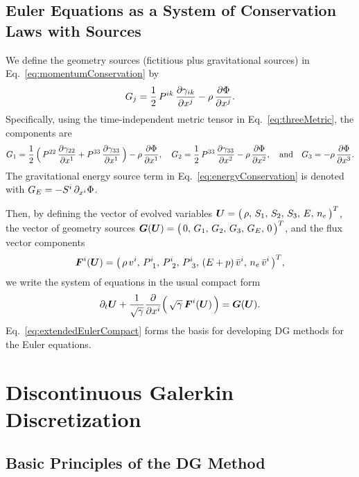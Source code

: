 \documentclass[10pt,preprint]{aastex}
\begin{document}
\subsection{Euler Equations as a System of Conservation Laws with Sources}

We define the geometry sources (fictitious plus gravitational sources) in Eq.~\eqref{eq:momentumConservation} by
\begin{equation}
  G_{j}
  =\frac{1}{2}\,P^{ik}\,\frac{\partial \gamma_{ik}}{\partial x^{j}}-\rho\,\frac{\partial \Phi}{\partial x^{j}}.  
\end{equation}
Specifically, using the time-independent metric tensor in Eq.~\eqref{eq:threeMetric}, the components are
\begin{equation}
  G_{1}
  =\frac{1}{2}\,\Big(\,P^{22}\,\frac{\partial \gamma_{22}}{\partial x^{1}}+P^{33}\,\frac{\partial \gamma_{33}}{\partial x^{1}}\,\Big)-\rho\,\frac{\partial \Phi}{\partial x^{1}}, \quad
  G_{2}
  =\frac{1}{2}\,P^{33}\,\frac{\partial \gamma_{33}}{\partial x^{2}}-\rho\,\frac{\partial \Phi}{\partial x^{2}}, \quad\text{and}\quad
  G_{3}
  =-\rho\,\frac{\partial \Phi}{\partial x^{3}}.
\end{equation}
The gravitational energy source term in Eq.~\eqref{eq:energyConservation} is denoted with $G_{E}=-S^{i}\,\partial_{x^{i}}{\Phi}$.  

Then, by defining the vector of evolved variables $\boldsymbol{U}=\big(\,\rho,\,S_{1},\,S_{2},\,S_{3},\,E,\,n_{e}\,\big)^{T}$, the vector of geometry sources $\boldsymbol{G}(\boldsymbol{U})=\big(\,0,\,G_{1},\,G_{2},\,G_{3},\,G_{E},\,0\,\big)^{T}$, and the flux vector components
\begin{equation}
  \boldsymbol{F}^{i}(\boldsymbol{U})
  =\big(\,\rho\,v^{i},\,P_{~1}^{i},\,P_{~2}^{i},\,P_{~3}^{i},\,(E+p)\,\bar{v}^{i},\,n_{e}\,\bar{v}^{i}\,\big)^{T},
\end{equation}
we write the system of equations in the usual compact form
\begin{equation}
  \partial_{t}{\boldsymbol{U}}
  +\frac{1}{\sqrt{\gamma}}\frac{\partial }{\partial x^{i}}\Big(\,\sqrt{\gamma}\,\boldsymbol{F}^{i}(\boldsymbol{U})\,\Big)
  =\boldsymbol{G}(\boldsymbol{U}).
  \label{eq:extendedEulerCompact}
\end{equation}
Eq.~\eqref{eq:extendedEulerCompact} forms the basis for developing DG methods for the Euler equations.  

\section{Discontinuous Galerkin Discretization}

\subsection{Basic Principles of the DG Method}
\end{document}
